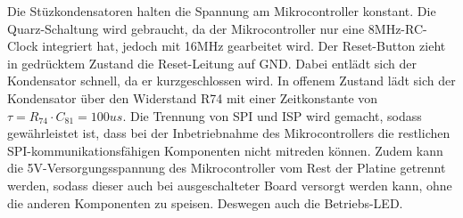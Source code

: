Die Stüzkondensatoren halten die Spannung am Mikrocontroller konstant. Die Quarz-Schaltung wird gebraucht, da der Mikrocontroller nur eine 8MHz-RC-Clock integriert hat, jedoch mit 16MHz gearbeitet wird. Der Reset-Button zieht in gedrücktem Zustand die Reset-Leitung auf GND. Dabei entlädt sich der Kondensator schnell, da er kurzgeschlossen wird. In offenem Zustand lädt sich der Kondensator über den Widerstand R74 mit einer Zeitkonstante von $\tau = R_{74} \cdot C_{81} = 100us$. Die Trennung von SPI und ISP wird gemacht, sodass gewährleistet ist, dass bei der Inbetriebnahme des Mikrocontrollers die restlichen SPI-kommunikationsfähigen Komponenten nicht mitreden können. Zudem kann die 5V-Versorgungsspannung des Mikrocontroller vom Rest der Platine getrennt werden, sodass dieser auch bei ausgeschalteter Board versorgt werden kann, ohne die anderen Komponenten zu speisen. Deswegen auch die Betriebs-LED.